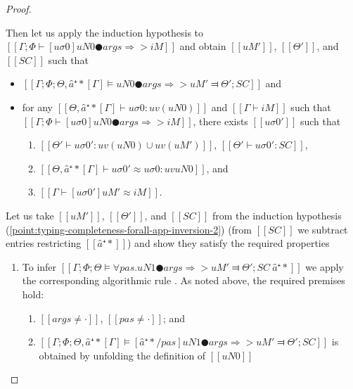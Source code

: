 \begin{proof}
\begin{caseof}
\begin{enumerate}
\begin{enumerate}
                            Then let us apply the induction hypothesis
                            to $[[Γ; Φ ⊢ [uσ0]uN0 ● args ⇒> iM]]$ and obtain 
                            $[[uM']]$, $[[Θ']]$, and $[[SC]]$ such that
                            \begin{itemize}
                                \item $[[ Γ; Φ; Θ, â⁺*[Γ] ⊨ uN0 ● args ⇒> uM' ⫤ Θ'; SC ]]$ and
                                \item \label{point:typing-completeness-forall-app-inversion-3}
                                for any $[[Θ, â⁺*[Γ]  ⊢ uσ0 : uv(uN0)]]$ and $[[Γ ⊢ iM]]$
                                    such that $[[Γ; Φ ⊢ [uσ0]uN0 ● args ⇒> iM]]$, 
                                    there exists $[[uσ0']]$ such that 
                                \begin{enumerate}
                                    \item $[[Θ'  ⊢uσ0' : uv(uN0) ∪ uv(uM')]]$, $[[ Θ' ⊢ uσ0'  : SC ]] $,
                                    \item $[[Θ, â⁺*[Γ] ⊢ uσ0' ≈ uσ0 : uv uN0]]$, and 
                                    \item $[[Γ ⊢ [uσ0']uM' ≈ iM]]$.
                                \end{enumerate}
                            \end{itemize}
                    \end{enumerate}
            \end{enumerate}
            Let us take $[[uM']]$, $[[Θ']]$, and $[[SC]]$ from the induction hypothesis
            (\ref{point:typing-completeness-forall-app-inversion-2}) 
            (from $[[SC]]$ we subtract entries restricting $[[{â⁺*}]]$)
            and show they satisfy the required properties 
            \begin{enumerate}
                \item To infer $[[ Γ; Φ; Θ ⊨ ∀pas.uN1 ● args ⇒> uM' ⫤ Θ'; SC \ {â⁺*} ]]$
                    we apply the corresponding algorithmic rule .
                    As noted above, the required premises hold:
                    \begin{enumerate}
                        \item $[[args ≠ ·]]$, $[[pas ≠ ·]]$; and
                        \item $[[Γ; Φ; Θ, â⁺*[Γ] ⊨ [â⁺*/pas]uN1 ● args ⇒> uM' ⫤ Θ'; SC]]$
                            is obtained by unfolding the definition of $[[uN0]]$

\end{enumerate}
\end{enumerate}
\end{caseof}
\end{proof}
